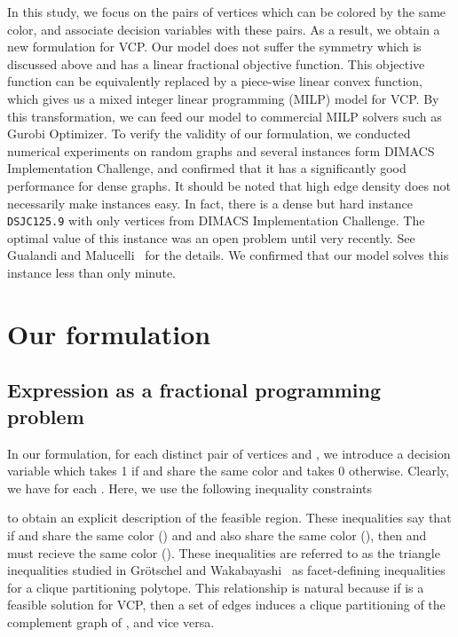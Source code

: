 \documentclass[11pt,a4paper]{article}
\begin{document}
\par 

In this study, we focus on the pairs of vertices which can be colored by the same color, 
and associate decision variables with these pairs. 
As a result, we obtain a new formulation for VCP. 
Our model does not suffer the symmetry which is discussed above and has a linear fractional objective function. 
This objective function can be equivalently replaced by a piece-wise linear convex function, 
which gives us a mixed integer linear programming (MILP) model for VCP. 
By this transformation, we can feed our model to commercial MILP solvers such as Gurobi Optimizer. 
To verify the validity of our formulation, we conducted numerical experiments 
on random graphs and several instances form DIMACS Implementation Challenge, 
and confirmed that it has a significantly good performance for dense graphs. 
It should be noted that high edge density does not necessarily make instances easy. 
In fact, there is a dense but hard instance \texttt{DSJC125.9} with only  vertices from DIMACS Implementation Challenge. 
The optimal value of this instance was an open problem until very recently. See Gualandi and Malucelli~\cite{GuMa} for the details.  
We confirmed that our model solves this instance less than only  minute. 


\section{Our formulation}\label{sec:F}

\subsection{Expression as a fractional programming problem}

In our formulation, for each distinct pair of vertices  and , 
we introduce a decision variable  
which takes 1 if  and  share the same color and takes 0 otherwise. 
Clearly, we have  for each . 
Here, we use the following inequality constraints 

to obtain an explicit description of the feasible region. 
These inequalities say that if  and  share the same color () 
and  and  also share the same color (), 
then  and  must recieve the same color (). 
These inequalities are referred to as the triangle inequalities 
studied in Gr\"otschel and Wakabayashi~\cite{GrWa} as facet-defining inequalities for a clique partitioning polytope. 
This relationship is natural because 
if  is a feasible solution for VCP, then a set  of edges 
induces a clique partitioning of the complement graph  of , and vice versa. 
\end{document}
